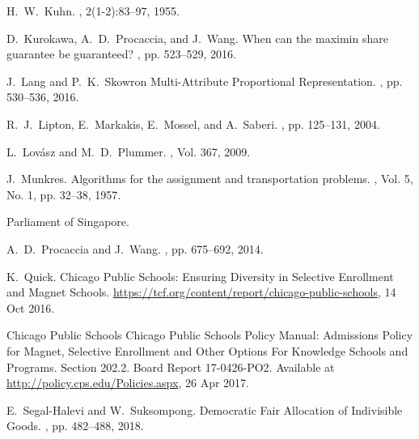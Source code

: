\documentclass[11pt,dvipdfmx]{article}
\begin{document}
\begin{thebibliography}{10}
\begin{small}
		 H.~W.~Kuhn.  , 2(1-2):83--97, 1955.
	
		 D.~Kurokawa, A.~D.~Procaccia, and J.~Wang. \newblock When can the maximin share guarantee be guaranteed? , pp. 523--529, 2016.
	
		 J.~Lang and P.~K.~Skowron \newblock Multi-Attribute Proportional Representation. , pp. 530--536, 2016.
	
		 R.~J.~Lipton, E.~Markakis, E.~Mossel, and A.~Saberi.  , pp. 125--131, 2004.
	
		 L.~Lov{\'a}sz and M.~D.~Plummer.  , Vol. 367, 2009. 
	
		 J.~Munkres. \newblock Algorithms for the assignment and transportation problems. , Vol. 5, No. 1, pp. 32--38, 1957.
	
		 {Parliament of Singapore.}  
	
		 A.~D.~Procaccia and J.~Wang.  , pp. 675--692, 2014.
	
		 K.~Quick. \newblock Chicago Public Schools: Ensuring Diversity in Selective Enrollment and Magnet Schools.   \url{https://tcf.org/content/report/chicago-public-schools}, 14 Oct 2016.
	
		 Chicago Public Schools \newblock Chicago Public Schools Policy Manual: Admissions Policy for Magnet, Selective Enrollment and Other Options For Knowledge Schools and Programs. \newblock Section 202.2. Board Report 17-0426-PO2. Available at \url{http://policy.cps.edu/Policies.aspx}, 26 Apr 2017.
	
		 E.~Segal-Halevi and W.~Suksompong. \newblock Democratic Fair Allocation of Indivisible Goods. , pp. 482--488, 2018.
	

\end{small}
\end{thebibliography}
\end{document}
